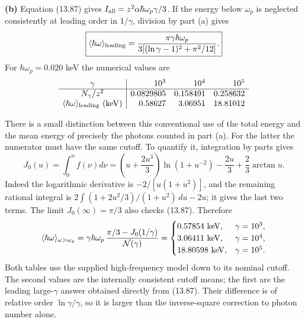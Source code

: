 \textbf{(b)} Equation (13.87) gives
$I_{\rm all}=z^2\alpha\hbar\omega_p\gamma/3$.
If the energy below $\omega_p$ is neglected consistently at leading
order in $1/\gamma$, division by part (a) gives
\[
 \boxed{\langle\hbar\omega\rangle_{\rm leading}
 =\frac{\pi\gamma\hbar\omega_p}
 {3[(\ln\gamma-1)^2+\pi^2/12]}.}
\]
For $\hbar\omega_p=0.020$ keV the numerical values are
\[
\begin{array}{c|rrr}
 \gamma&10^3&10^4&10^5\\ \hline
 N_\gamma/z^2&0.0829805&0.158491&0.258632\\
 \langle\hbar\omega\rangle_{\rm leading}\ ({\rm keV})
     &0.58627&3.06951&18.81012
\end{array}
\]

There is a small distinction between this conventional use of the total
energy and the mean energy of precisely the photons counted in part (a).
For the latter the numerator must have the same cutoff. To quantify it,
integration by parts gives
\[
 J_0(u)=\int_0^u f(\nu)d\nu
 =\left(u+\frac{2u^3}{3}\right)\ln(1+u^{-2})
   -\frac{2u}{3}+\frac23\arctan u.
\]
Indeed the logarithmic derivative is $-2/[u(1+u^2)]$, and the
remaining rational integral is
$2\int(1+2u^2/3)/(1+u^2)\,du-2u$; it gives the last two terms.
The limit $J_0(\infty)=\pi/3$ also checks (13.87). Therefore
\[
 \langle\hbar\omega\rangle_{\omega>\omega_p}
 =\gamma\hbar\omega_p\,
 \frac{\pi/3-J_0(1/\gamma)}{{\cal N}(\gamma)}
 =\begin{cases}
 0.57854\ {\rm keV},&\gamma=10^3,\\
 3.06411\ {\rm keV},&\gamma=10^4,\\
 18.80598\ {\rm keV},&\gamma=10^5.
 \end{cases}
\]
Both tables use the supplied high-frequency model down to its nominal
cutoff. The second values are the internally consistent cutoff means;
the first are the leading large-$\gamma$ answer obtained directly from
(13.87). Their difference is of relative order $\ln\gamma/\gamma$,
so it is larger than the inverse-square correction to photon number
alone.




